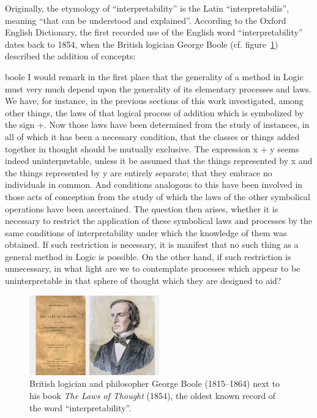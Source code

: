 Originally, the etymology of ``interpretability'' is the Latin ``interpretabilis'', meaning ``that can be understood and explained''.
According to the Oxford English Dictionary, the first recorded use of the English word ``interpretability'' dates back to 1854, when the British logician George Boole (cf. figure~\ref{fig:george-boole}) described the addition of concepts:

\begin{displaycquote}[p.~48]{boole}
I would remark in the first place that the generality of a method in Logic
must very much depend upon the generality of its elementary processes and laws.
We have, for instance, in the previous sections of this work investigated, among
other things, the laws of that logical process of addition which is symbolized by
the sign +. Now those laws have been determined from the study of instances,
in all of which it has been a necessary condition, that the classes or things added
together in thought should be mutually exclusive. The expression x + y seems
indeed uninterpretable, unless it be assumed that the things represented by x
and the things represented by y are entirely separate; that they embrace no
individuals in common. And conditions analogous to this have been involved
in those acts of conception from the study of which the laws of the other
symbolical operations have been ascertained. The question then arises, whether
it is necessary to restrict the application of these symbolical laws and processes
by the same conditions of interpretability under which the knowledge of them
was obtained. If such restriction is necessary, it is manifest that no such thing
as a general method in Logic is possible. On the other hand, if such restriction
is unnecessary, in what light are we to contemplate processes which appear to
be uninterpretable in that sphere of thought which they are designed to aid?\label{quote:boole}
\end{displaycquote}

\begin{figure}
    \centering
    \includegraphics[width=0.5\textwidth]{images/images_intro/gboole.jpg}
    \caption{British logician and philosopher George Boole (1815--1864) next to his book \textit{The Laws of Thought} (1854), the oldest known record of the word ``interpretability''.}
    \label{fig:george-boole}
\end{figure}

